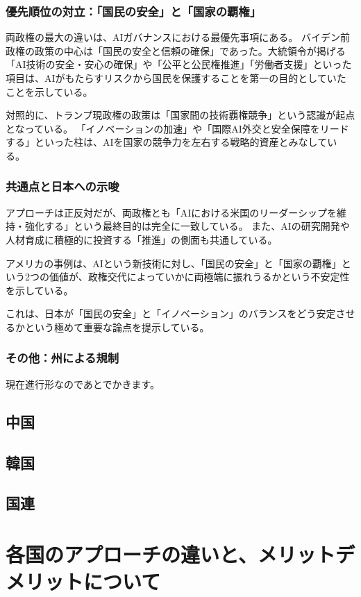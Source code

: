 \subsubsection*{優先順位の対立：「国民の安全」と「国家の覇権」}

両政権の最大の違いは、AIガバナンスにおける最優先事項にある。
バイデン前政権の政策の中心は「国民の安全と信頼の確保」であった。大統領令が掲げる「AI技術の安全・安心の確保」や「公平と公民権推進」「労働者支援」といった項目は、AIがもたらすリスクから国民を保護することを第一の目的としていたことを示している。

対照的に、トランプ現政権の政策は「国家間の技術覇権競争」という認識が起点となっている。
「イノベーションの加速」や「国際AI外交と安全保障をリードする」といった柱は、AIを国家の競争力を左右する戦略的資産とみなしている。

\subsubsection*{共通点と日本への示唆}

アプローチは正反対だが、両政権とも「AIにおける米国のリーダーシップを維持・強化する」という最終目的は完全に一致している。
また、AIの研究開発や人材育成に積極的に投資する「推進」の側面も共通している。

アメリカの事例は、AIという新技術に対し、「国民の安全」と「国家の覇権」という2つの価値が、政権交代によっていかに両極端に振れうるかという不安定性を示している。

これは、日本が「国民の安全」と「イノベーション」のバランスをどう安定させるかという極めて重要な論点を提示している。

\subsubsection{その他：州による規制}
現在進行形なのであとでかきます。

\subsection{中国}

\subsection{韓国}

\subsection{国連}

\section{各国のアプローチの違いと、メリットデメリットについて}
